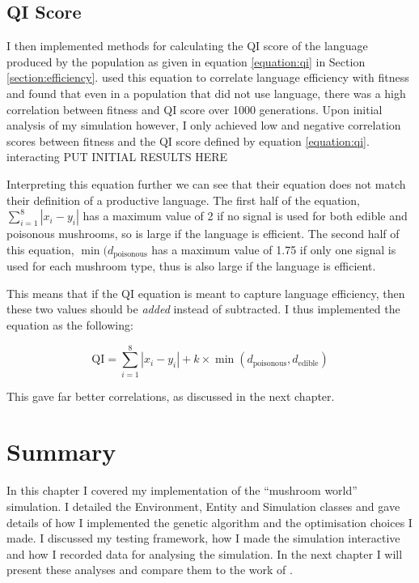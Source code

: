 \documentclass[12pt,a4paper,twoside,openright]{report}
\begin{document}
\subsection{QI Score}

I then implemented methods for calculating the QI score of the language produced by the population as given in equation \ref{equation:qi} in Section \ref{section:efficiency}. \citet{Cangelosi1998} used this equation to correlate language efficiency with fitness and found that even in a population that did not use language, there was a high correlation between fitness and QI score over 1000 generations. Upon initial analysis of my simulation however, I only achieved low and negative correlation scores between fitness and the QI score defined by equation \ref{equation:qi}. 
interacting
PUT INITIAL RESULTS HERE

Interpreting this equation further we can see that their equation does not match their definition of a productive language. The first half of the equation, $\sum^{8}_{i = 1} |x_i - y_i|$ has a maximum value of 2 if no signal is used for both edible and poisonous mushrooms, so is large if the language is efficient. The second half of this equation, $\min (d_{\mathrm{poisonous}}$ has a maximum value of 1.75 if only one signal is used for each mushroom type, thus is also large if the language is efficient. 

This means that if the QI equation is meant to capture language efficiency, then these two values should be \emph{added} instead of subtracted. I thus implemented the equation as the following:

\begin{equation}
\label{equation:qibetter}
\mathrm{QI} = \sum^{8}_{i = 1} |x_i - y_i| + k \times \min (d_{\mathrm{poisonous}}, d_{\mathrm{edible}})
\end{equation}

This gave far better correlations, as discussed in the next chapter.

\section{Summary}

In this chapter I covered my implementation of the ``mushroom world'' simulation. I detailed the Environment, Entity and Simulation classes and gave details of how I implemented the genetic algorithm and the optimisation choices I made. I discussed my testing framework, how I made the simulation interactive and how I recorded data for analysing the simulation. In the next chapter I will present these analyses and compare them to the work of \citet{Cangelosi1998}.
\end{document}
